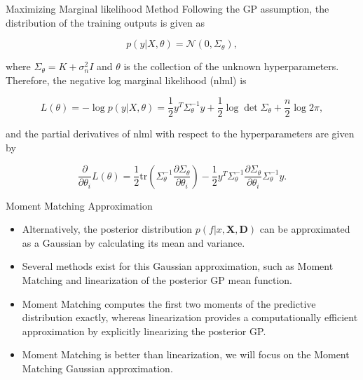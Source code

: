 \begin{frame}{Maximizing Marginal likelihood Method}
    Following the GP assumption, the distribution of the training outputs is
given as

\begin{equation}
p(y|X, \theta) = \mathcal{N} (0, \Sigma_{\theta}),
\end{equation}

where $\Sigma_{\theta} = K + \sigma^2_n I$ and $\theta$ is the collection of the unknown hyperparameters. Therefore, the negative log marginal likelihood (nlml) is

\begin{equation}
L(\theta) = - \log p(y|X, \theta) = \frac{1}{2} y^T \Sigma^{-1}_{\theta} y + \frac{1}{2} \log \det \Sigma_{\theta} + \frac{n}{2} \log 2\pi,
\end{equation}

and the partial derivatives of nlml with respect to the hyperparameters are given
by

\begin{equation}
\frac{\partial}{\partial \theta_i} L(\theta) = \frac{1}{2} \mathrm{tr} \left( \Sigma^{-1}_{\theta} \frac{\partial \Sigma_{\theta}}{\partial \theta_i} \right) - \frac{1}{2} y^T \Sigma^{-1}_{\theta} \frac{\partial \Sigma_{\theta}}{\partial \theta_i} \Sigma^{-1}_{\theta} y.
\end{equation}

\end{frame}





\begin{frame}{Moment Matching Approximation}

\begin{itemize}
    \item Alternatively, the posterior distribution \( p(f|x, \mathbf{X}, \mathbf{D}) \) can be approximated as a Gaussian by calculating its mean and variance.
    \item Several methods exist for this Gaussian approximation, such as Moment Matching and linearization of the posterior GP mean function. %
    \item Moment Matching computes the first two moments of the predictive distribution exactly, whereas linearization provides a computationally efficient approximation by explicitly linearizing the posterior GP.
    \item Moment Matching is better than linearization, we will focus on the Moment Matching Gaussian approximation.
\end{itemize}
\end{frame}

